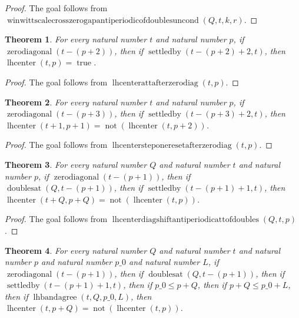 \documentclass[11pt]{article}
\newtheorem{theorem}{Theorem}[section]
\theoremstyle{definition}
\begin{document}
\begin{proof}
The goal follows from \(\operatorname{winwittscalecrosszerogapantiperiodicofdoublesuncond}(Q, t, k, r)\).
\end{proof}
\begin{theorem}
\label{ll:paper:lhcenter-at-t-after-zero-diag}
For every natural number \(t\) and natural number \(p\), if \(\operatorname{zerodiagonal}(t - (p + 2))\), then if \(\operatorname{settledby}(t - (p + 2) + 2, t)\), then \(\operatorname{lhcenter}(t, p) = \operatorname{true}\).
\end{theorem}
\begin{proof}
The goal follows from \(\operatorname{lhcenterattafterzerodiag}(t, p)\).
\end{proof}
\begin{theorem}
\label{ll:paper:lhcenter-step-one-reset-after-zero-diag}
For every natural number \(t\) and natural number \(p\), if \(\operatorname{zerodiagonal}(t - (p + 3))\), then if \(\operatorname{settledby}(t - (p + 3) + 2, t)\), then \(\operatorname{lhcenter}(t + 1, p + 1) = \operatorname{not}(\operatorname{lhcenter}(t, p + 2))\).
\end{theorem}
\begin{proof}
The goal follows from \(\operatorname{lhcentersteponeresetafterzerodiag}(t, p)\).
\end{proof}
\begin{theorem}
\label{ll:paper:lhcenter-diag-shift-antiperiodic-at-t-of-doubles}
For every natural number \(Q\) and natural number \(t\) and natural number \(p\), if \(\operatorname{zerodiagonal}(t - (p + 1))\), then if \(\operatorname{doublesat}(Q, t - (p + 1))\), then if \(\operatorname{settledby}(t - (p + 1) + 1, t)\), then \(\operatorname{lhcenter}(t + Q, p + Q) = \operatorname{not}(\operatorname{lhcenter}(t, p))\).
\end{theorem}
\begin{proof}
The goal follows from \(\operatorname{lhcenterdiagshiftantiperiodicattofdoubles}(Q, t, p)\).
\end{proof}
\begin{theorem}
\label{ll:paper:lhcenter-spatial-antiperiodic-at-t-of-doubles-and-lhbandagree}
For every natural number \(Q\) and natural number \(t\) and natural number \(p\) and natural number \(p\_0\) and natural number \(L\), if \(\operatorname{zerodiagonal}(t - (p + 1))\), then if \(\operatorname{doublesat}(Q, t - (p + 1))\), then if \(\operatorname{settledby}(t - (p + 1) + 1, t)\), then if \(p\_0 \le p + Q\), then if \(p + Q \le p\_0 + L\), then if \(\operatorname{lhbandagree}(t, Q, p\_0, L)\), then \(\operatorname{lhcenter}(t, p + Q) = \operatorname{not}(\operatorname{lhcenter}(t, p))\).
\end{theorem}
\end{document}
